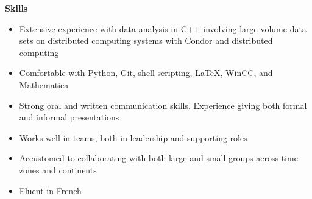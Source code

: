 \documentclass[line]{letter}
\begin{document}
{\vspace{10pt}\Large \bf Skills\vspace{-12pt}\\}
\begin{itemize}[leftmargin=*]
\item Extensive experience with data analysis in C++ involving large volume data sets on distributed computing
systems with Condor and distributed computing%

\item Comfortable with Python, Git, shell scripting, \LaTeX, WinCC, and Mathematica%

\item Strong oral and written communication skills. Experience giving both formal and informal presentations%

\item Works well in teams, both in leadership and supporting roles

\item Accustomed to collaborating with both large and
small groups across time zones and continents%

\item Fluent in French
\end{itemize}

\end{document}
